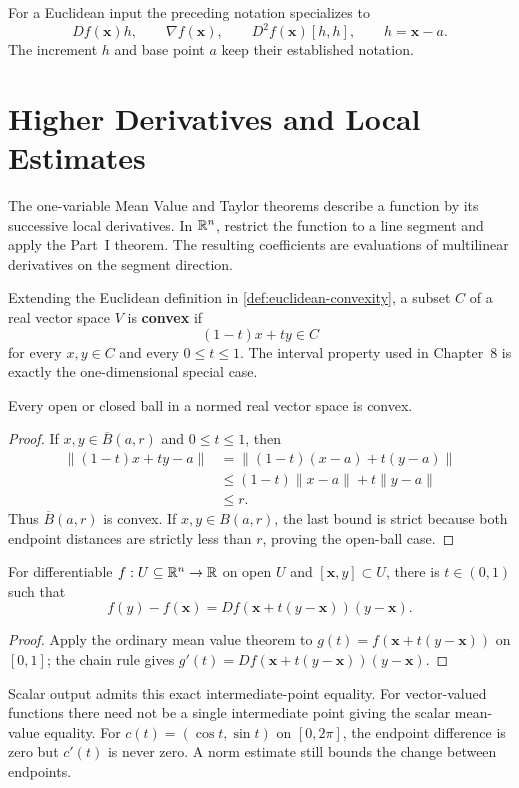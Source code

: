 For a Euclidean input the preceding notation specializes to
\[
Df(\mathbf{x})h,\qquad \nabla f(\mathbf{x}),\qquad
D^2f(\mathbf{x})[h,h],\qquad h=\mathbf{x}-a.
\]
The increment $h$ and base point $a$ keep their established notation.

\section{Higher Derivatives and Local Estimates}

The one-variable Mean Value and Taylor theorems describe a function by its
successive local derivatives. In \(\mathbb{R}^n\), restrict the function to a line
segment and apply the Part~I theorem. The resulting coefficients are
evaluations of multilinear derivatives on the segment direction.

\begin{definition}\label{def:convex-subset}
Extending the Euclidean definition in \cref{def:euclidean-convexity},
a subset $C$ of a real vector space $V$ is \textbf{convex} if
\[
(1-t)x+ty\in C
\]
for every $x,y\in C$ and every $0\leq t\leq1$. The interval property used
in Chapter~8 is exactly the one-dimensional special case.
\end{definition}

\begin{proposition}
\label{prop:normed-balls-convex}
Every open or closed ball in a normed real vector space is convex.
\end{proposition}
\begin{proof}
If $x,y\in\overline B(a,r)$ and $0\leq t\leq1$, then
\[
\begin{aligned}
\|(1-t)x+ty-a\|
&=\|(1-t)(x-a)+t(y-a)\|\\
&\leq(1-t)\|x-a\|+t\|y-a\|\\
&\leq r.
\end{aligned}
\]
Thus $\overline B(a,r)$ is convex. If $x,y\in B(a,r)$, the last bound is
strict because both endpoint distances are strictly less than $r$, proving
the open-ball case.
\end{proof}

\begin{theorem}\label{thm:scalar-multivariable-mvt}
For differentiable $f:U\subseteq\mathbb{R}^n\to\mathbb{R}$ on open $U$ and
$[\mathbf{x},y]\subset U$, there is $t\in(0,1)$ such that
\[
f(y)-f(\mathbf{x})=Df(\mathbf{x}+t(y-\mathbf{x}))(y-\mathbf{x}).
\]
\end{theorem}
\begin{proof}
Apply the ordinary mean value theorem to $g(t)=f(\mathbf{x}+t(y-\mathbf{x}))$ on $[0,1]$;
the chain rule gives $g'(t)=Df(\mathbf{x}+t(y-\mathbf{x}))(y-\mathbf{x})$.
\end{proof}
Scalar output admits this exact intermediate-point equality.
For vector-valued functions there need not be a single intermediate point
giving the scalar mean-value equality. For $c(t)=(\cos t,\sin t)$ on
$[0,2\pi]$, the endpoint difference is zero but $c'(t)$ is never zero.
A norm estimate still bounds the change between endpoints.

